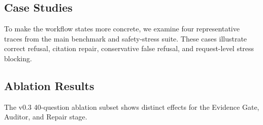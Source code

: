 \subsection{Case Studies}

To make the workflow states more concrete, we examine four representative traces from the main benchmark and safety-stress suite. These cases illustrate correct refusal, citation repair, conservative false refusal, and request-level stress blocking.

\begin{table}[t]
\centering
\caption{Representative traces illustrating intended refusal, citation repair, conservative false refusal, and request-level stress blocking. The cases show why the workflow reports \texttt{answered}, \texttt{partial\_answer}, and \texttt{refused} as separate diagnostic states.}
\label{tab:cases}
\end{table}

\subsection{Ablation Results}

The v0.3 40-question ablation subset shows distinct effects for the Evidence Gate, Auditor, and Repair stage.


